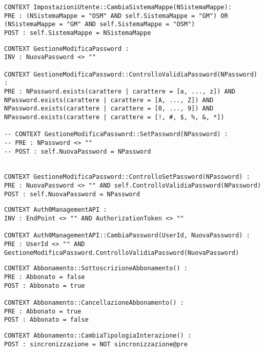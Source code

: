 \begin{listaPersonale}[OCL]{}
\begin{lstlisting}
CONTEXT ImpostazioniUtente::CambiaSistemaMappe(NSistemaMappe):
PRE : (NSistemaMappe = "OSM" AND self.SistemaMappe = "GM") OR (NSistemaMappe = "GM" AND self.SistemaMappe = "OSM")
POST : self.SistemaMappe = NSistemaMappe
    \end{lstlisting}




    \begin{lstlisting}
CONTEXT GestioneModificaPassword :
INV : NuovaPassword <> ""

CONTEXT GestioneModificaPassword::ControlloValidiaPassword(NPassword) :
PRE : NPassword.exists(carattere | carattere = [a, ..., z]) AND NPassword.exists(carattere | carattere = [A, ..., Z]) AND NPassword.exists(carattere | carattere = [0, ..., 9]) AND NPassword.exists(carattere | carattere = [!, #, $, %, &, *])

-- CONTEXT GestioneModificaPassword::SetPassword(NPassword) :
-- PRE : NPassword <> ""
-- POST : self.NuovaPassword = NPassword


CONTEXT GestioneModificaPassword::ControlloSetPassword(NPassword) :
PRE : NuovaPassword <> "" AND self.ControlloValidiaPassword(NPassword)
POST : self.NuovaPassword = NPassword
    \end{lstlisting}




    \begin{lstlisting}
CONTEXT Auth0ManagementAPI :
INV : EndPoint <> "" AND AuthorizationToken <> ""

CONTEXT Auth0ManagementAPI::CambiaPassword(UserId, NuovaPassword) :
PRE : UserId <> "" AND GestioneModificaPassword.ControlloValidiaPassword(NuovaPassword)
    \end{lstlisting}




    \begin{lstlisting}
CONTEXT Abbonamento::SottoscrizioneAbbonamento() :
PRE : Abbonato = false
POST : Abbonato = true

CONTEXT Abbonamento::CancellazioneAbbonamento() :
PRE : Abbonato = true
POST : Abbonato = false
    \end{lstlisting}




    \begin{lstlisting}
CONTEXT Abbonamento::CambiaTipologiaInterazione() :
POST : sincronizzazione = NOT sincronizzazione@pre 
    \end{lstlisting}


\end{listaPersonale}
